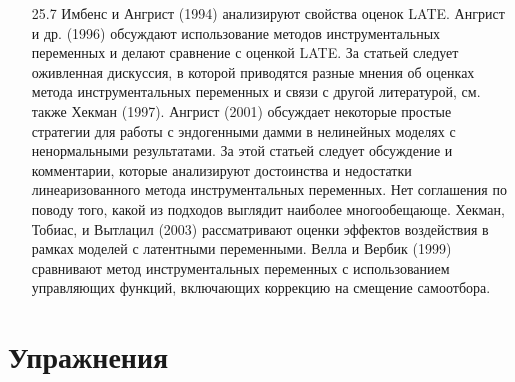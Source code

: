 \begin{enumerate}
\item[25.7] Имбенс и Ангрист (1994) анализируют свойства оценок LATE. Ангрист и др. (1996) обсуждают использование методов инструментальных переменных и делают сравнение с оценкой LATE. За статьей следует оживленная дискуссия, в которой приводятся разные мнения об оценках метода инструментальных переменных и связи с другой литературой, см. также Хекман (1997). Ангрист (2001) обсуждает некоторые простые стратегии для работы с эндогенными дамми в нелинейных моделях с ненормальными результатами. За этой статьей следует обсуждение и комментарии, которые анализируют достоинства и недостатки линеаризованного метода инструментальных переменных. Нет соглашения по поводу того, какой из подходов выглядит наиболее многообещающе. Хекман, Тобиас, и Вытлацил (2003) рассматривают оценки эффектов воздействия в рамках моделей с латентными переменными. Велла и Вербик (1999) сравнивают метод инструментальных переменных с использованием управляющих функций, включающих коррекцию на смещение самоотбора. 
\end{enumerate}

\section*{Упражнения}

